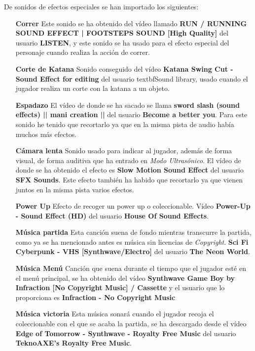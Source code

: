 De sonidos de efectos especiales se han importado los siguientes: 
\begin{itemize}
    \item[\textbf{Correr}] Este sonido se ha obtenido del vídeo llamado \textbf{RUN / RUNNING SOUND EFFECT | FOOTSTEPS SOUND [High Quality]} del usuario \textbf{LISTEN}, y este sonido se ha usado para el efecto especial del personaje cuando realiza la acción de correr.
    \item[\textbf{Corte de Katana}] Sonido conseguido del vídeo \textbf{Katana Swing Cut - Sound Effect for editing} del usuario textbf{Sound library}, usado cuando el jugador realiza un corte con la katana a un objeto.
    \item[\textbf{Espadazo}] El vídeo de donde se ha sacado se llama \textbf{sword slash (sound effects) || mani creation ||} del usuario \textbf{Become a better you}. Para este sonido he tenido que recortarlo ya que en la misma pista de audio había muchos más efectos.
    \item[\textbf{Cámara lenta}] Sonido usado para indicar al jugador, además de forma visual, de forma auditiva que ha entrado en \textit{Modo Ultrasónico}. El vídeo de donde se ha obtenido el efecto es \textbf{Slow Motion Sound Effect} del usuario \textbf{SFX Sounds}. Este efecto también ha habido que recortarlo ya que vienen juntos en la misma pista varios efectos.
    \item[\textbf{Power Up}] Efecto de recoger un power up o coleccionable. Vídeo \textbf{Power-Up - Sound Effect (HD)} del usuario \textbf{House Of Sound Effects}.
    \item[\textbf{Música partida}] Esta canción suena de fondo mientras transcurre la partida, como ya se ha mencionado antes es música sin licencias de \textit{Copyright}. \textbf{Sci Fi Cyberpunk - VHS [Synthwave/Electro]} del usuario \textbf{The Neon World}.
    \item[\textbf{Música Menú }] Canción que suena durante el tiempo que el jugador esté en el menú principal, se ha obtenido del vídeo \textbf{Synthwave Game Boy by Infraction [No Copyright Music] / Cassette} y el usuario que lo proporciona es \textbf{Infraction - No Copyright Music}
    \item[\textbf{Música victoria}] Esta música sonará cuando el jugador recoja el coleccionable con el que se acaba la partida, se ha descargado desde el vídeo \textbf{Edge of Tomorrow - Synthwave - Royalty Free Music} del usuario \textbf{TeknoAXE's Royalty Free Music}.  
\end{itemize}

